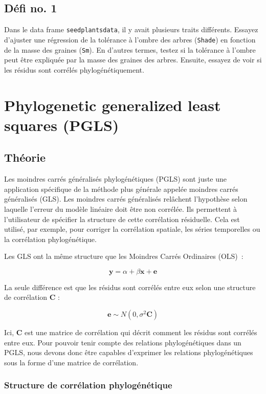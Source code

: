 \documentclass[
]{book}
\begin{document}
\section{Défi no. 1}\label{duxe9fi-no.-1}

Dans le data frame \texttt{seedplantsdata}, il y avait plusieurs traits différents. Essayez d'ajuster une régression de la tolérance à l'ombre des arbres (\texttt{Shade}) en fonction de la masse des graines (\texttt{Sm}). En d'autres termes, testez si la tolérance à l'ombre peut être expliquée par la masse des graines des arbres. Ensuite, essayez de voir si les résidus sont corrélés phylogénétiquement.

\chapter{Phylogenetic generalized least squares (PGLS)}\label{pgls}

\section{Théorie}\label{thuxe9orie-1}

Les moindres carrés généralisés phylogénétiques (PGLS) sont juste une application spécifique de la méthode plus générale appelée moindres carrés généralisés (GLS). Les moindres carrés généralisés relâchent l'hypothèse selon laquelle l'erreur du modèle linéaire doit être non corrélée. Ils permettent à l'utilisateur de spécifier la structure de cette corrélation résiduelle. Cela est utilisé, par exemple, pour corriger la corrélation spatiale, les séries temporelles ou la corrélation phylogénétique.

Les GLS ont la même structure que les Moindres Carrés Ordinaires (OLS)~:

\[\textbf{y} = \alpha + \beta \textbf{x} + \textbf{e}\]

La seule différence est que les résidus sont corrélés entre eux selon une structure de corrélation \(\textbf{C}\) :

\[\textbf{e} \sim N(0,\sigma^2\textbf{C})\]

Ici, \(\textbf{C}\) est une matrice de corrélation qui décrit comment les résidus sont corrélés entre eux. Pour pouvoir tenir compte des relations phylogénétiques dans un PGLS, nous devons donc être capables d'exprimer les relations phylogénétiques sous la forme d'une matrice de corrélation.

\subsection{Structure de corrélation phylogénétique}\label{structure-de-corruxe9lation-phyloguxe9nuxe9tique}
\end{document}
